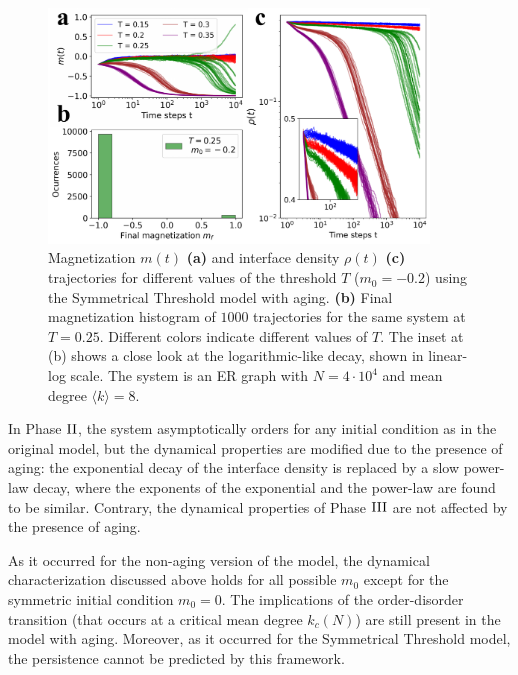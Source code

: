 \begin{figure}
    \centering \captionsetup{font=sf}
    \includegraphics[width=0.9\textwidth]{Figs/Aging_STM/FIG7.pdf}
    \caption[Phase ${\rm I}^{*}$ slow decay and minority consensus]{\label{fig:mixed_phase} Magnetization $m(t)$ \textbf{(a)} and interface density $\rho(t)$ \textbf{(c)} trajectories for different values of the threshold $T$ ($m_0 = -0.2$) using the Symmetrical Threshold model with aging. \textbf{(b)} Final magnetization histogram of $1000$ trajectories for the same system at $T=0.25$. Different colors indicate different values of $T$. The inset at (b) shows a close look at the logarithmic-like decay, shown in linear-log scale. The system is an ER graph with $N = 4 \cdot 10^4$ and mean degree $\langle k \rangle = 8$.}
\end{figure}
In Phase ${\rm II}$, the system asymptotically orders for any initial condition as in the original model, but the dynamical properties are modified due to the presence of aging: the exponential decay of the interface density is replaced by a slow power-law decay, where the exponents of the exponential and the power-law are found to be similar. Contrary, the dynamical properties of Phase ${\rm III}$ are not affected by the presence of aging. 

As it occurred for the non-aging version of the model, the dynamical characterization discussed above holds for all possible
$m_0$ except for the symmetric initial condition $m_0 = 0$. The implications of the order-disorder transition (that occurs at a critical mean degree $k_c (N)$) \cite{Pournaki-2022} are still present in the model with aging. Moreover, as it occurred for the Symmetrical Threshold model, the persistence cannot be predicted by this framework.

